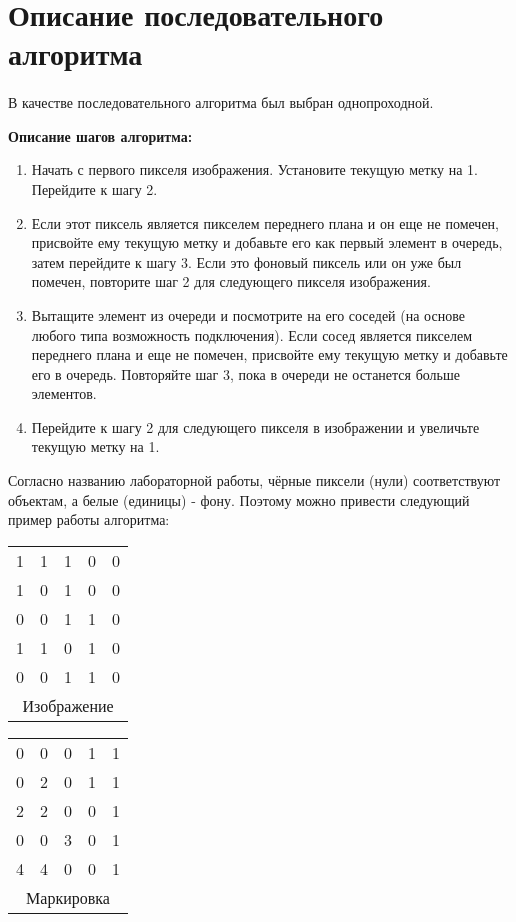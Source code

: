 \documentclass[14pt]{extarticle}
\begin{document}
\section{Описание последовательного алгоритма}
\paragraph{}В качестве последовательного алгоритма был выбран однопроходной. 
\par \textbf{Описание шагов алгоритма:}
\begin{enumerate}
    \item Начать с первого пикселя изображения. Установите текущую метку на 1. Перейдите к шагу 2.
    \item Если этот пиксель является пикселем переднего плана и он еще не помечен, присвойте ему текущую метку и добавьте его как первый элемент в очередь, затем перейдите к шагу 3. Если это фоновый пиксель или он уже был помечен, повторите шаг 2 для следующего пикселя изображения.
    \item Вытащите элемент из очереди и посмотрите на его соседей (на основе любого типа возможность подключения). Если сосед является пикселем переднего плана и еще не помечен, присвойте ему текущую метку и добавьте его в очередь. Повторяйте шаг 3, пока в очереди не останется больше элементов.
    \item Перейдите к шагу 2 для следующего пикселя в изображении и увеличьте текущую метку на 1.
\end{enumerate}
\par Согласно названию лабораторной работы, чёрные пиксели (нули) соответствуют объектам, а белые (единицы) - фону. Поэтому можно привести следующий пример работы алгоритма:
\par
\hfill
\begin{tabular}{ |c c c c c| }
\hline
 1 & 1 & 1 & 0 & 0\\  
 1 & 0 & 1 & 0 & 0\\  
 0 & 0 & 1 & 1 & 0\\  
 1 & 1 & 0 & 1 & 0\\   
 0 & 0 & 1 & 1 & 0\\
 \hline
 \multicolumn{5}{c}{Изображение}
\end{tabular}
\qquad
\begin{tabular}{ |c c c c c| }
\hline
 0 & 0 & 0 & 1 & 1\\  
 0 & 2 & 0 & 1 & 1\\  
 2 & 2 & 0 & 0 & 1\\  
 0 & 0 & 3 & 0 & 1\\  
 4 & 4 & 0 & 0 & 1\\
 \hline
 \multicolumn{5}{c}{Маркировка}
\end{tabular}
\hfill \break
\newpage
\end{document}
